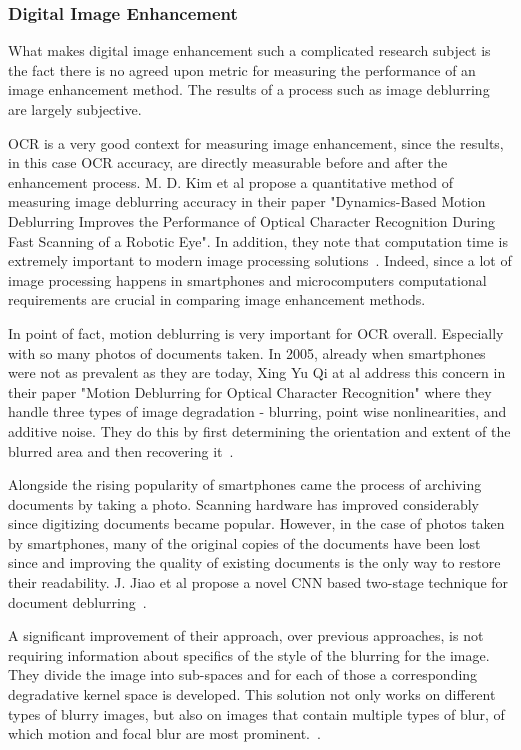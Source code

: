 \documentclass[12pt]{article}
\begin{document}
\subsubsection{Digital Image Enhancement}

What makes digital image enhancement such a complicated research subject is the fact there is no agreed upon metric for measuring the performance of an image enhancement method. The results of a process such as image deblurring are largely subjective.

OCR is a very good context for measuring image enhancement, since the results, in this case OCR accuracy, are directly measurable before and after the enhancement process. M. D. Kim et al propose a quantitative method of measuring image deblurring accuracy in their paper "Dynamics-Based Motion Deblurring Improves the Performance of Optical
Character Recognition During Fast Scanning of a Robotic Eye". In addition, they note that computation time is extremely important to modern image processing solutions~\cite{dynbmd}. Indeed, since a lot of image processing happens in smartphones and microcomputers computational requirements are crucial in comparing image enhancement methods.

In point of fact, motion deblurring is very important for OCR overall. Especially with so many photos of documents taken. In 2005, already when smartphones were not as prevalent as they are today, Xing Yu Qi at al address this concern in their paper "Motion Deblurring for Optical Character Recognition" where they handle three types of image degradation - blurring, point wise nonlinearities, and additive noise. They do this by first determining the orientation and extent of the blurred area and then recovering it~\cite{1575575}.

Alongside the rising popularity of smartphones came the process of archiving documents by taking a photo. Scanning hardware has improved considerably since digitizing documents became popular. However, in the case of photos taken by smartphones, many of the original copies of the documents have been lost since and improving the quality of existing documents is the only way to restore their readability. J. Jiao et al propose a novel CNN based two-stage technique for document deblurring~\cite{8270051}.

A significant improvement of their approach, over previous approaches, is not requiring information about specifics of the style of the blurring for the image. They divide the image into sub-spaces and for each of those a corresponding degradative kernel space is developed. This solution not only works on different types of blurry images, but also on images that contain multiple types of blur, of which motion and focal blur are most prominent.~\cite{8270051}.
\end{document}
